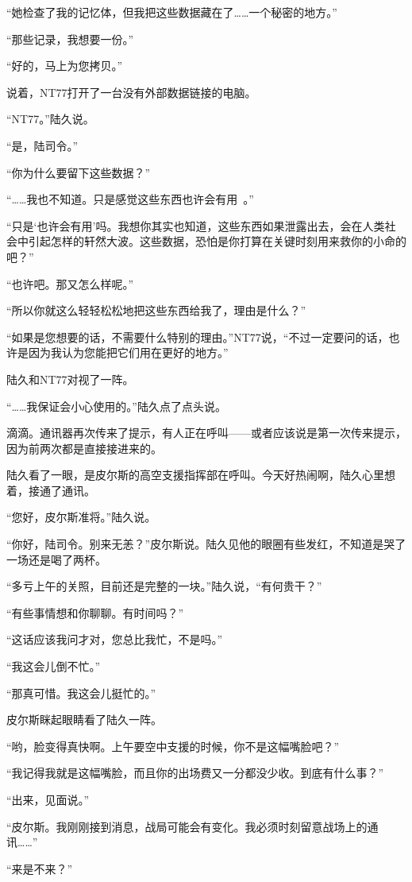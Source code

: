 “她检查了我的记忆体，但我把这些数据藏在了……一个秘密的地方。”

“那些记录，我想要一份。”

“好的，马上为您拷贝。”

说着，NT77打开了一台没有外部数据链接的电脑。

“NT77。”陆久说。

“是，陆司令。”

“你为什么要留下这些数据？”

“……我也不知道。只是感觉这些东西也许会有用 。”

“只是‘也许会有用’吗。我想你其实也知道，这些东西如果泄露出去，会在人类社会中引起怎样的轩然大波。这些数据，恐怕是你打算在关键时刻用来救你的小命的吧？”

“也许吧。那又怎么样呢。”

“所以你就这么轻轻松松地把这些东西给我了，理由是什么？”

“如果是您想要的话，不需要什么特别的理由。”NT77说，“不过一定要问的话，也许是因为我认为您能把它们用在更好的地方。”

陆久和NT77对视了一阵。

“……我保证会小心使用的。”陆久点了点头说。

滴滴。通讯器再次传来了提示，有人正在呼叫——或者应该说是第一次传来提示，因为前两次都是直接接进来的。

陆久看了一眼，是皮尔斯的高空支援指挥部在呼叫。今天好热闹啊，陆久心里想着，接通了通讯。

“您好，皮尔斯准将。”陆久说。

“你好，陆司令。别来无恙？”皮尔斯说。陆久见他的眼圈有些发红，不知道是哭了一场还是喝了两杯。

“多亏上午的关照，目前还是完整的一块。”陆久说，“有何贵干？”

“有些事情想和你聊聊。有时间吗？”

“这话应该我问才对，您总比我忙，不是吗。”

“我这会儿倒不忙。”

“那真可惜。我这会儿挺忙的。”

皮尔斯眯起眼睛看了陆久一阵。

“哟，脸变得真快啊。上午要空中支援的时候，你不是这幅嘴脸吧？”

“我记得我就是这幅嘴脸，而且你的出场费又一分都没少收。到底有什么事？”

“出来，见面说。”

“皮尔斯。我刚刚接到消息，战局可能会有变化。我必须时刻留意战场上的通讯……”

“来是不来？”

